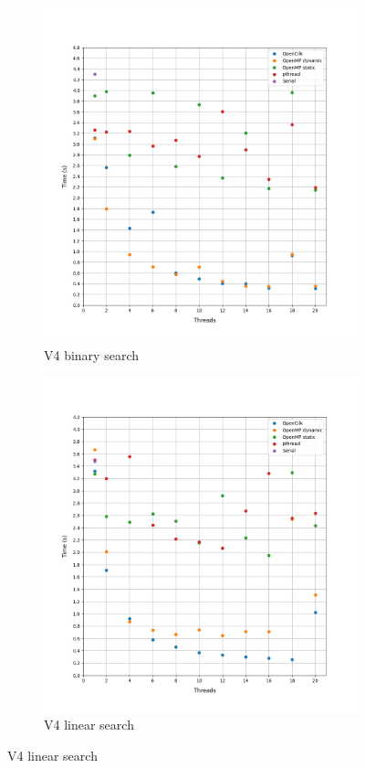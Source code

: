 \documentclass[12pt, a4paper]{article}
\begin{document}
\begin{figure}[h!]
\begin{subfigure}[b]{0.33\textwidth}
         \includegraphics[height=.4\textheight, width=\textwidth, keepaspectratio]{assets/youtube/v4_binary.png}
         \caption{V4 binary search}
     \end{subfigure}
     \begin{subfigure}[b]{0.33\textwidth}
         \centering
         \includegraphics[height=.4\textheight, width=\textwidth, keepaspectratio]{assets/youtube/v4_linear.png}
         \caption{V4 linear search} 
     \end{subfigure}
\end{figure}
\end{document}
